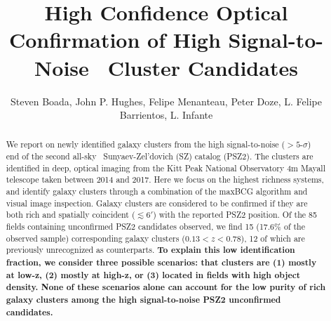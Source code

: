 \documentclass[apj, revtex4-1]{emulateapj}
\begin{document}
\title{High Confidence Optical Confirmation of High Signal-to-Noise \planck\ Cluster Candidates}

\author{\sc Steven Boada,
John P. Hughes,
Felipe Menanteau,
Peter Doze,
L. Felipe Barrientos,
L. Infante
}



\begin{abstract}
\noindent We report on newly identified galaxy clusters from the high signal-to-noise ($>5$-$\sigma$) end of the second all-sky \planck\ Sunyaev-Zel'dovich (SZ) catalog (PSZ2). The clusters are identified in deep, optical imaging from the Kitt Peak National Observatory 4m Mayall telescope taken between 2014 and 2017. Here we focus on the highest richness systems, and identify galaxy clusters through a combination of the maxBCG algorithm and visual image inspection. Galaxy clusters are considered to be confirmed if they are both rich and spatially coincident ($\lesssim 6'$) with the reported PSZ2 position. Of the 85 fields containing unconfirmed PSZ2 candidates observed, we find 15 (17.6\% of the observed sample) corresponding galaxy clusters ($ 0.13 < z < 0.78$), 12 of which are previously unrecognized as counterparts. \textbf{To explain this low identification fraction, we consider three possible scenarios: that clusters are (1) mostly at low-z, (2) mostly at high-z, or (3) located in fields with high object density.  None of these scenarios alone can account for the low purity of rich galaxy clusters among the high signal-to-noise PSZ2 unconfirmed candidates.}
\end{abstract}
\end{document}

